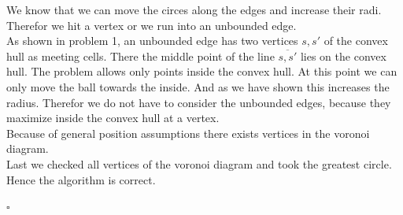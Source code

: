 \documentclass[11pt,a4paper,ngerman]{article}
\begin{document}
We know that we can move the circes along the edges and increase their radi. Therefor we hit a vertex or we run into an unbounded edge.\\
As shown in problem 1, an unbounded edge has two vertices $s,s'$ of the convex hull as meeting cells. There the middle point of the line $\overline{s,s'}$
lies on the convex hull. The problem allows only points inside the convex hull. At this point we can only move the ball towards the inside.
And as we have shown this increases the radius. Therefor we do not have to consider the unbounded edges, because they maximize inside the convex hull
at a vertex.\\

Because of general position assumptions there exists vertices in the voronoi diagram.\\

Last we checked all vertices of the voronoi diagram and took the greatest circle. Hence the algorithm is correct.

\mbox{}\hfill $\square$

\label{LastPage}
\end{document}
